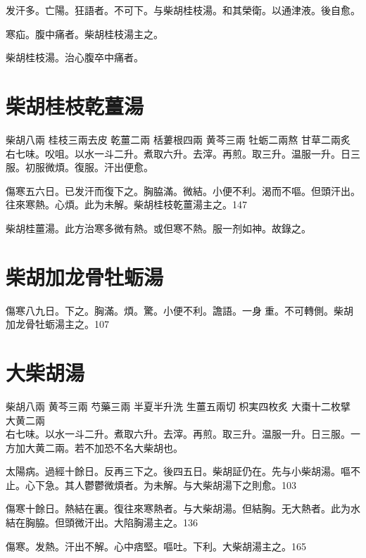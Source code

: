 发汗多。亡陽。狂語者。不可下。与柴胡桂枝湯。和其榮衛。以通津液。後自愈。

寒疝。腹中痛者。柴胡桂枝湯主之。{\wuben}

柴胡桂枝湯。治心腹卒中痛者。{\dengben}

\section{柴胡桂枝乾薑湯}

柴胡{\scriptsize 八兩} 桂枝{\scriptsize 三兩去皮} 乾薑{\scriptsize 二兩} 栝蔞根{\scriptsize 四兩} 黄芩{\scriptsize 三兩} 牡蛎{\scriptsize 二兩熬} 甘草{\scriptsize 二兩炙}\\
右七味。{\khaaitp 㕮咀。}以水一斗二升。煮取六升。去滓。再煎。取三升。温服一升。日三服。初服微煩。{\khaaitp 復服。}汗出{\khaaitp 便}愈。

傷寒五六日。已发汗而復下之。胸脇滿。微結。小便不利。渴而不嘔。但頭汗出。往來寒熱。心煩。此为未解。柴胡桂枝乾薑湯主之。147

柴胡桂薑湯。{\scriptsize 此方治寒多微有熱。或但寒不熱。服一剂如神。故錄之。}

\section{柴胡加龙骨牡蛎湯}

傷寒八九日。下之。胸滿。煩。驚。小便不利。譫語。一身{\khaaitpii 𥁞}{\khaaitp 重。}不可轉側。柴胡加龙骨牡蛎湯主之。107

\section{大柴胡湯}

柴胡{\scriptsize 八兩} 黄芩{\scriptsize 三兩} 芍藥{\scriptsize 三兩} 半夏{\scriptsize 半升洗} 生薑{\scriptsize 五兩切} 枳実{\scriptsize 四枚炙} 大棗{\scriptsize 十二枚擘} {\khaaitp 大黄{\scriptsize 二兩}}\\
右七味。以水一斗二升。煮取六升。去滓。再煎。{\khaaitp 取三升。}温服一升。日三服。一方加大黄二兩。若不加恐不名大柴胡也。

太陽病。過經十餘日。反再三下之。後四五日。柴胡証仍在。先与小柴胡湯。嘔不止。心下急。其人鬱鬱微煩者。为未解。与大柴胡湯下之則愈。103

傷寒十餘日。熱結在裏。復往來寒熱者。与大柴胡湯。但結胸。无大熱者。此为水結在胸脇。{\khaaitp 但}頭微汗出。大陷胸湯主之。136

傷寒。发熱。汗出不解。心中痞堅。嘔吐。下利。大柴胡湯主之。165

